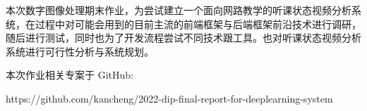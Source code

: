 \begin{cabstract}

本次数字图像处理期末作业，为尝试建立一个面向网路教学的听课状态视频分析系统，在过程中对可能会用到的目前主流的前端框架与后端框架前沿技术进行调研，随后进行测试，同时也为了开发流程尝试不同技术跟工具。也对听课状态视频分析系统进行可行性分析与系统规划。

本次作业相关专案于 GitHub:

https://github.com/kancheng/2022-dip-final-report-for-deeplearning-system



\end{cabstract}


